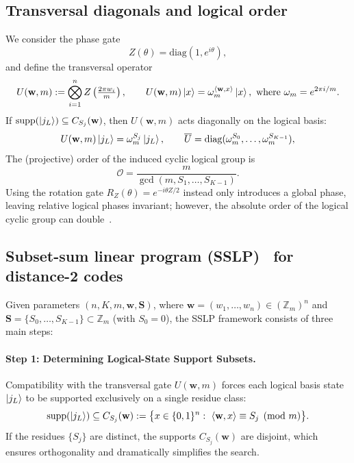 \documentclass[pdflatex,sn-nature]{sn-jnl}%
\theoremstyle{thmstyleone}%
\theoremstyle{thmstyletwo}%
\theoremstyle{thmstylethree}%
\begin{document}
\begin{appendices}
\subsection{Transversal diagonals and logical order}
\label{subsec:transversals}

We consider the phase gate
\[Z(\theta)=\mathrm{diag}(1,e^{i\theta}),\]
and define the transversal operator
\begin{equation}
    U(\mathbf w,m):=\bigotimes_{i=1}^n Z \left(\tfrac{2\pi w_i}{m}\right),\qquad
    U(\mathbf w,m)\ket{x}= \omega_m^{\langle \mathbf w,x\rangle}\ket{x}, \
    \text{where } \omega_m=e^{2\pi i/m}.
    \label{eq:U-pre}
\end{equation}
If $\mathrm{supp}(\ket{j_L})\subseteq C_{S_j}(\mathbf w)$, then $U(\mathbf w,m)$ acts diagonally on the logical basis:
\begin{equation}
    U(\mathbf w,m)\ket{j_L}=\omega_m^{S_j}\ket{j_L},\qquad
    \overline U=\mathrm{diag}(\omega_m^{S_0},\dots,\omega_m^{S_{K-1}}),
    \label{eq:logical-diag-pre}
\end{equation}
The (projective) order of the induced cyclic logical group is
\begin{equation}
    \mathcal O=\frac{m}{\gcd(m,S_1,\dots,S_{K-1})}.
    \label{eq:order-pre}
\end{equation}
Using the rotation gate $R_Z(\theta)=e^{-i\theta Z/2}$ instead only introduces a global phase, leaving relative logical phases invariant; however, the absolute order of the logical cyclic group can double~\cite{Zhang2025Transversal}.

\subsection{Subset-sum linear program (SSLP)~\cite{Zhang2025Transversal} for distance-2 codes}
\label{subsec:sslp}

Given parameters $(n,K,m,\mathbf w,\mathbf S)$, where $\mathbf w=(w_1,\dots,w_n)\in(\mathbb Z_m)^n$ and $\mathbf S=\{S_0,\dots,S_{K-1}\}\subset\mathbb Z_m$ (with $S_0=0$), the SSLP framework consists of three main steps:

\paragraph{Step 1: Determining Logical-State Support Subsets.}
Compatibility with the transversal gate $U(\mathbf w,m)$ forces each logical basis state $\ket{j_L}$ to be supported exclusively on a single residue class:
\[
    \mathrm{supp}(\ket{j_L}) \subseteq C_{S_j}(\mathbf w):=\bigl\{x\in\{0,1\}^n:\ \langle \mathbf w,x\rangle \equiv S_j \pmod m \bigr\}.
\]
If the residues $\{S_j\}$ are distinct, the supports $C_{S_j}(\mathbf w)$ are disjoint, which ensures orthogonality and dramatically simplifies the search.



\end{appendices}
\end{document}
